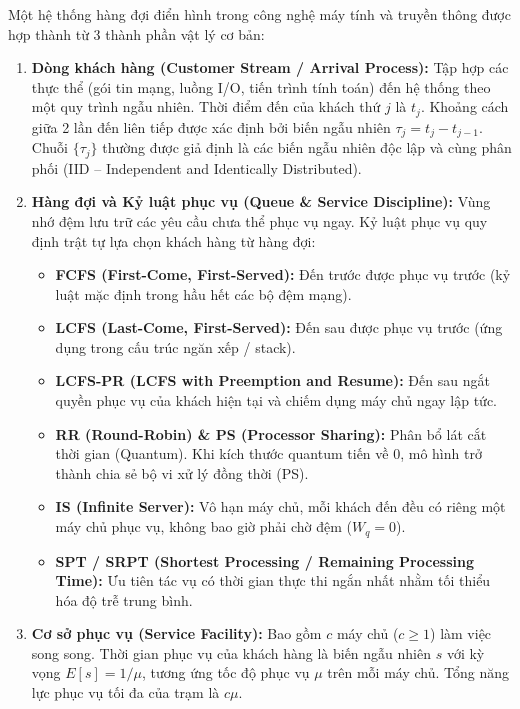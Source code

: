 \hspace{0.5cm}Một hệ thống hàng đợi điển hình trong công nghệ máy tính và truyền thông được hợp thành từ 3 thành phần vật lý cơ bản:
\begin{enumerate}[leftmargin=1.5em]
    \item \textbf{Dòng khách hàng (Customer Stream / Arrival Process):} Tập hợp các thực thể (gói tin mạng, luồng I/O, tiến trình tính toán) đến hệ thống theo một quy trình ngẫu nhiên. Thời điểm đến của khách thứ $j$ là $t_j$. Khoảng cách giữa 2 lần đến liên tiếp được xác định bởi biến ngẫu nhiên $\tau_j = t_j - t_{j-1}$. Chuỗi $\{\tau_j\}$ thường được giả định là các biến ngẫu nhiên độc lập và cùng phân phối (IID -- Independent and Identically Distributed).
    \item \textbf{Hàng đợi và Kỷ luật phục vụ (Queue \& Service Discipline):} Vùng nhớ đệm lưu trữ các yêu cầu chưa thể phục vụ ngay. Kỷ luật phục vụ quy định trật tự lựa chọn khách hàng từ hàng đợi:
    \begin{itemize}
        \item \textbf{FCFS (First-Come, First-Served):} Đến trước được phục vụ trước (kỷ luật mặc định trong hầu hết các bộ đệm mạng).
        \item \textbf{LCFS (Last-Come, First-Served):} Đến sau được phục vụ trước (ứng dụng trong cấu trúc ngăn xếp / stack).
        \item \textbf{LCFS-PR (LCFS with Preemption and Resume):} Đến sau ngắt quyền phục vụ của khách hiện tại và chiếm dụng máy chủ ngay lập tức.
        \item \textbf{RR (Round-Robin) \& PS (Processor Sharing):} Phân bổ lát cắt thời gian (Quantum). Khi kích thước quantum tiến về 0, mô hình trở thành chia sẻ bộ vi xử lý đồng thời (PS).
        \item \textbf{IS (Infinite Server):} Vô hạn máy chủ, mỗi khách đến đều có riêng một máy chủ phục vụ, không bao giờ phải chờ đệm ($W_q = 0$).
        \item \textbf{SPT / SRPT (Shortest Processing / Remaining Processing Time):} Ưu tiên tác vụ có thời gian thực thi ngắn nhất nhằm tối thiểu hóa độ trễ trung bình.
    \end{itemize}
    \item \textbf{Cơ sở phục vụ (Service Facility):} Bao gồm $c$ máy chủ ($c \ge 1$) làm việc song song. Thời gian phục vụ của khách hàng là biến ngẫu nhiên $s$ với kỳ vọng $E[s] = 1/\mu$, tương ứng tốc độ phục vụ $\mu$ trên mỗi máy chủ. Tổng năng lực phục vụ tối đa của trạm là $c\mu$.
\end{enumerate}

